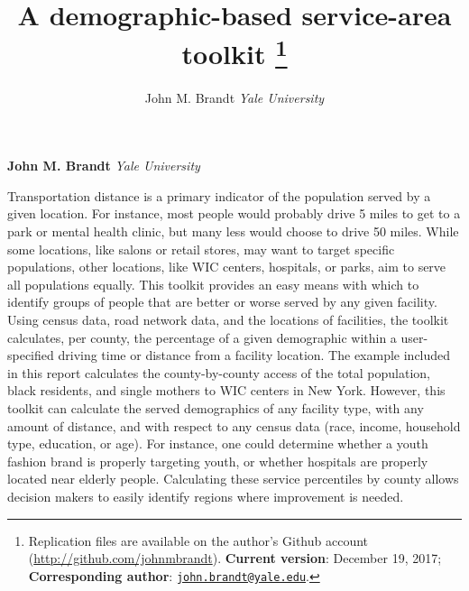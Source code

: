 \documentclass[11pt,]{article}
\title{A demographic-based service-area toolkit \thanks{Replication files are available on the author's Github account
(\url{http://github.com/johnmbrandt}). \textbf{Current version}:
December 19, 2017; \textbf{Corresponding author}:
\href{mailto:john.brandt@yale.edu}{\nolinkurl{john.brandt@yale.edu}}.}  }
\author{\Large John M. Brandt\vspace{0.05in} \newline\normalsize\emph{Yale University}  }
\date{}
\newcommand*{\authorfont}{\fontfamily{phv}\selectfont}
\renewenvironment{abstract}
 {{%
    \setlength{\leftmargin}{0mm}
    \setlength{\rightmargin}{\leftmargin}%
  }%
  \relax}
 {\endlist}
\begin{document}
	
%

{%
\setlength{\parindent}{0pt}
\thispagestyle{plain}
{\fontsize{18}{20}\selectfont\raggedright 
\maketitle  %

}

{
   \vskip 13.5pt\relax \normalsize\fontsize{11}{12} 
\textbf{\authorfont John M. Brandt} \hskip 15pt \emph{\small Yale University}   

}

}








\begin{abstract}

    \hbox{\vrule height .2pt width 39.14pc}

    \vskip 8.5pt %

\noindent Transportation distance is a primary indicator of the population served
by a given location. For instance, most people would probably drive 5
miles to get to a park or mental health clinic, but many less would
choose to drive 50 miles. While some locations, like salons or retail
stores, may want to target specific populations, other locations, like
WIC centers, hospitals, or parks, aim to serve all populations equally.
This toolkit provides an easy means with which to identify groups of
people that are better or worse served by any given facility. Using
census data, road network data, and the locations of facilities, the
toolkit calculates, per county, the percentage of a given demographic
within a user-specified driving time or distance from a facility
location. The example included in this report calculates the
county-by-county access of the total population, black residents, and
single mothers to WIC centers in New York. However, this toolkit can
calculate the served demographics of any facility type, with any amount
of distance, and with respect to any census data (race, income,
household type, education, or age). For instance, one could determine
whether a youth fashion brand is properly targeting youth, or whether
hospitals are properly located near elderly people. Calculating these
service percentiles by county allows decision makers to easily identify
regions where improvement is needed.


    \hbox{\vrule height .2pt width 39.14pc}


\end{abstract}
\end{document}
